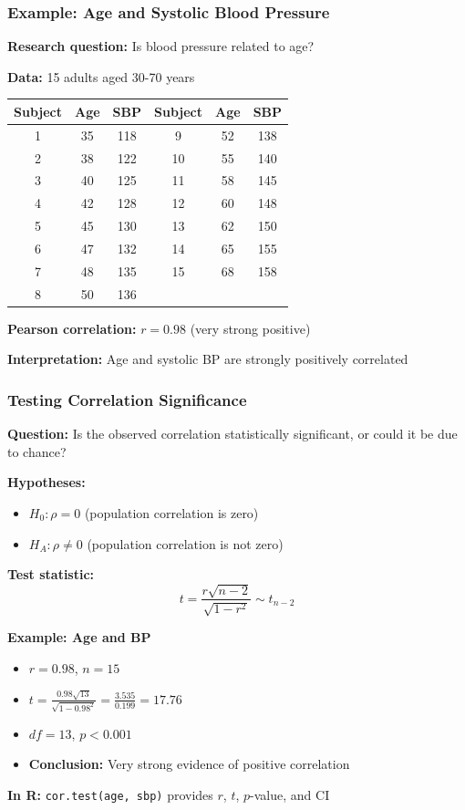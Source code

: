 \documentclass{beamer}
\begin{document}
\begin{frame}
\frametitle{Example: Age and Systolic Blood Pressure}
\textbf{Research question:} Is blood pressure related to age?

\vspace{0.3cm}
\textbf{Data:} 15 adults aged 30-70 years

\begin{center}
\begin{tabular}{ccc|ccc}
\toprule
Subject & Age & SBP & Subject & Age & SBP \\
\midrule
1 & 35 & 118 & 9 & 52 & 138 \\
2 & 38 & 122 & 10 & 55 & 140 \\
3 & 40 & 125 & 11 & 58 & 145 \\
4 & 42 & 128 & 12 & 60 & 148 \\
5 & 45 & 130 & 13 & 62 & 150 \\
6 & 47 & 132 & 14 & 65 & 155 \\
7 & 48 & 135 & 15 & 68 & 158 \\
8 & 50 & 136 & & & \\
\bottomrule
\end{tabular}
\end{center}

\vspace{0.3cm}
\textbf{Pearson correlation:} $r = 0.98$ (very strong positive)

\textbf{Interpretation:} Age and systolic BP are strongly positively correlated
\end{frame}

\begin{frame}
\frametitle{Testing Correlation Significance}
\textbf{Question:} Is the observed correlation statistically significant, or could it be due to chance?

\vspace{0.3cm}
\textbf{Hypotheses:}
\begin{itemize}
\item $H_0: \rho = 0$ (population correlation is zero)
\item $H_A: \rho \neq 0$ (population correlation is not zero)
\end{itemize}

\vspace{0.3cm}
\textbf{Test statistic:}
$$t = \frac{r\sqrt{n-2}}{\sqrt{1-r^2}} \sim t_{n-2}$$

\vspace{0.3cm}
\textbf{Example: Age and BP}
\begin{itemize}
\item $r = 0.98$, $n = 15$
\item $t = \frac{0.98\sqrt{13}}{\sqrt{1-0.98^2}} = \frac{3.535}{0.199} = 17.76$
\item $df = 13$, $p < 0.001$
\item \textbf{Conclusion:} Very strong evidence of positive correlation
\end{itemize}

\vspace{0.3cm}
\textbf{In R:} \texttt{cor.test(age, sbp)} provides $r$, $t$, $p$-value, and CI
\end{frame}
\end{document}
